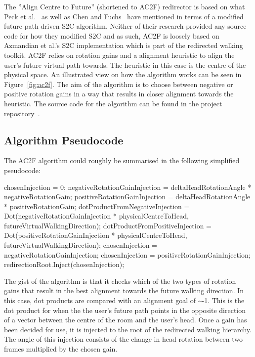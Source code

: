 The ''Align Centre to Future'' (shortened to AC2F) redirector is based on what Peck et al.~\cite{peck2010improved} as well as Chen and Fuchs~\cite{chen2017towards, chen2017supporting} have mentioned in terms of a modified future path driven S2C algorithm. Neither of their research provided any source code for how they modified S2C and as such, AC2F is loosely based on Azmandian et al.'s S2C implementation which is part of the redirected walking toolkit. AC2F relies on rotation gains and a alignment heuristic to align the user's future virtual path towards. The heuristic in this case is the centre of the physical space. An illustrated view on how the algorithm works can be seen in Figure~\ref{fig:ac2f}. The aim of the algorithm is to choose between negative or positive rotation gains in a way that results in closer alignment towards the heuristic. The source code for the algorithm can be found in the project repository~\cite{ac2fScript}.

\subsection{Algorithm Pseudocode}
The AC2F algorithm could roughly be summarised in the following simplified pseudocode:
\begin{algorithmic}
\State chosenInjection = 0;
    \State negativeRotationGainInjection = deltaHeadRotationAngle * negativeRotationGain;
    \State positiveRotationGainInjection = deltaHeadRotationAngle * positiveRotationGain;
    \State dotProductFromNegativeInjection = Dot(negativeRotationGainInjection * physicalCentreToHead, futureVirtualWalkingDirection);
    \State dotProductFromPositiveInjection = Dot(positiveRotationGainInjection * physicalCentreToHead, futureVirtualWalkingDirection);
        \State chosenInjection = negativeRotationGainInjection;
    \Else
        \State chosenInjection = positiveRotationGainInjection;
    \EndIf
\EndIf
\State redirectionRoot.Inject(chosenInjection);
\end{algorithmic}
The gist of the algorithm is that it checks which of the two types of rotation gains that result in the best alignment towards the future walking direction. In this case, dot products are compared with an alignment goal of \textasciitilde-1. This is the dot product for when the the user's future path points in the opposite direction of a vector between the centre of the room and the user's head. Once a gain has been decided for use, it is injected to the root of the redirected walking hierarchy. The angle of this injection consists of the change in head rotation between two frames multiplied by the chosen gain.

